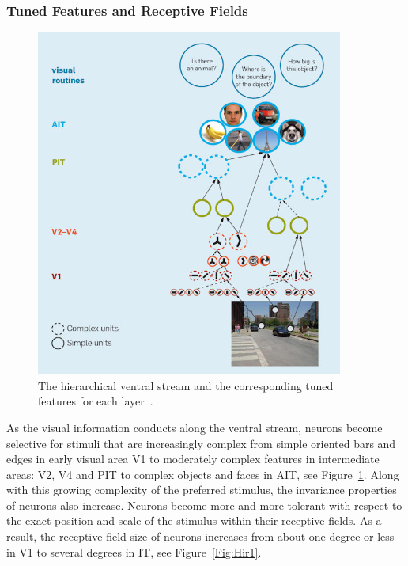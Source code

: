 \subsubsection{Tuned Features and Receptive Fields }
\begin{figure}[h!]
	\centering
	\includegraphics[width=0.9\textwidth]{pics_report/serre.jpg}
	\caption{The hierarchical ventral stream and the corresponding tuned features for each layer~\cite{serre2010neuromorphic}.}
	\label{Fig:serre}
\end{figure}
As the visual information conducts along the ventral stream, neurons become selective for stimuli that are increasingly complex from simple oriented bars and edges in early visual area V1 to moderately complex features in intermediate areas: V2, V4 and PIT to complex objects and faces in AIT, see Figure~\ref{Fig:serre}.
Along with this growing complexity of the preferred stimulus, the invariance properties of neurons also increase.
Neurons become more and more tolerant with respect to the exact position and scale of the stimulus within their receptive fields.
As a result, the receptive field size of neurons increases from
about one degree or less in V1 to several degrees in IT, see Figure~\ref{Fig:Hir1}.

